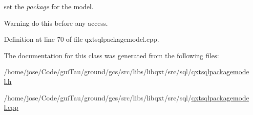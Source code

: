 set the {\itshape package} for the model. 

\begin{DoxyWarning}{Warning}
do this before any access. 
\end{DoxyWarning}


Definition at line 70 of file qxtsqlpackagemodel.\-cpp.



The documentation for this class was generated from the following files\-:\begin{DoxyCompactItemize}
\item 
/home/jose/\-Code/gui\-Tau/ground/gcs/src/libs/libqxt/src/sql/\hyperlink{qxtsqlpackagemodel_8h}{qxtsqlpackagemodel.\-h}\item 
/home/jose/\-Code/gui\-Tau/ground/gcs/src/libs/libqxt/src/sql/\hyperlink{qxtsqlpackagemodel_8cpp}{qxtsqlpackagemodel.\-cpp}\end{DoxyCompactItemize}
